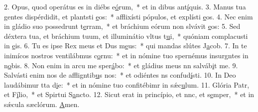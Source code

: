 2. Opus, quod operátus es in diébs e\uline{ó}rum,~* et in dibus ant\uline{í}quis.
3. Manus tua gentes dispérdidit, et plantsti \uline{e}os:~* afflixísti pópulos, et explísti \uline{e}os.
4. Nec enim in gládio suo possedrunt t\uline{e}rram,~* et bráchium eórum non slvávit \uline{e}os:
5. Sed déxtera tua, et bráchium tuum, et illuminátio vltus t\uline{u}i,~* quóniam complacusti in \uline{e}is.
6. Tu es ipse Rex meus et Dus m\uline{e}us:~* qui mandas slútes J\uline{a}cob.
7. In te inimícos nostros ventilábmus c\uline{o}rnu:~* et in nómine tuo spernémus insurgntes in n\uline{o}bis.
8. Non enim in arcu me sper\uline{á}bo:~* et gládius meus nn salváb\uline{i}t me.
9. Salvásti enim nos de affligntib\uline{u}s nos:~* et odiéntes ns confud\uline{í}sti.
10. In Deo laudábimur tta d\uline{i}e:~* et in nómine tuo confitébimr in sǽc\uline{u}lum.
11. Glória Patr, et F\uline{í}lio,~* et Spirtui S\uline{a}ncto.
12. Sicut erat in princípio, et nnc, et s\uline{e}mper,~* et in sǽcula sæclórum. \uline{A}men.
